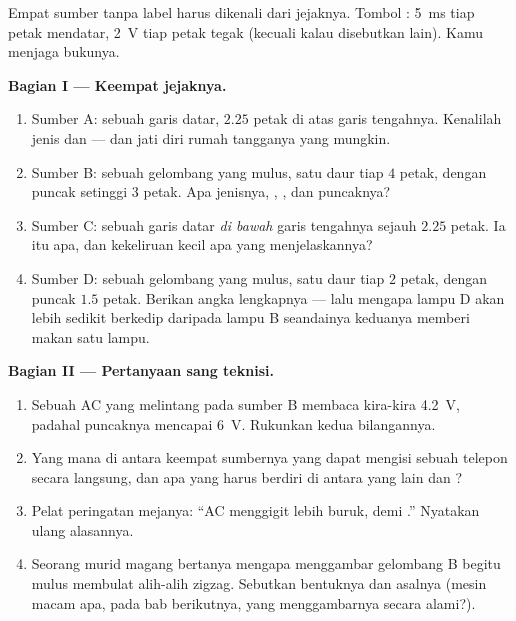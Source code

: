 \begin{problem}\label{pb:g9:alternating-current:1}
Empat sumber tanpa label harus dikenali dari jejaknya. Tombol
: \qty{5}{ms} tiap petak mendatar, \qty{2}{V} tiap petak
tegak (kecuali kalau disebutkan lain). Kamu menjaga bukunya.

\medskip\noindent\textbf{Bagian I --- Keempat jejaknya.}
\begin{enumerate}
  \item Sumber A: sebuah garis datar, $2.25$ petak di atas garis
        tengahnya. Kenalilah jenis dan  --- dan jati diri
        rumah tangganya yang mungkin.
  \item Sumber B: sebuah gelombang yang mulus, satu daur tiap $4$
        petak, dengan puncak setinggi $3$ petak. Apa jenisnya,
        , , dan  puncaknya?
  \item Sumber C: sebuah garis datar \emph{di bawah} garis tengahnya
        sejauh $2.25$ petak. Ia itu apa, dan kekeliruan kecil apa yang
        menjelaskannya?
  \item Sumber D: sebuah gelombang yang mulus, satu daur tiap $2$
        petak, dengan puncak $1.5$ petak. Berikan angka lengkapnya ---
        lalu mengapa lampu D akan lebih sedikit berkedip daripada
        lampu B seandainya keduanya memberi makan satu lampu.
\end{enumerate}

\medskip\noindent\textbf{Bagian II --- Pertanyaan sang
teknisi.}
\begin{enumerate}[resume]
  \item Sebuah  AC yang melintang pada sumber B membaca
        kira-kira \qty{4.2}{V}, padahal puncaknya mencapai \qty{6}{V}.
        Rukunkan kedua bilangannya.
  \item Yang mana di antara keempat sumbernya yang dapat mengisi
        sebuah telepon secara langsung, dan apa yang harus berdiri di
        antara yang lain dan ?
  \item Pelat peringatan mejanya: ``AC menggigit lebih buruk, 
        demi .'' Nyatakan ulang alasannya.
  \item Seorang murid magang bertanya mengapa  menggambar
        gelombang B begitu mulus membulat alih-alih zigzag. Sebutkan
        bentuknya dan asalnya (mesin macam apa, pada bab berikutnya,
        yang menggambarnya secara alami?).
\end{enumerate}


\end{problem}
